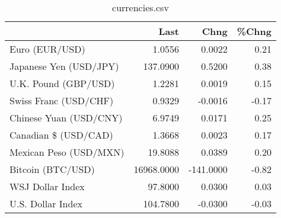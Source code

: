 \documentclass{article}%
\begin{document}
%


\begin{table}[htbp]%
\caption{currencies.csv}%
\centering%
\begin{adjustbox}{width=1\textwidth}%
\begin{tabular}{lrrr}
\toprule
                       &       Last &      Chng &  \%Chng \\
\midrule
        Euro (EUR/USD) &     1.0556 &    0.0022 &   0.21 \\
Japanese Yen (USD/JPY) &   137.0900 &    0.5200 &   0.38 \\
  U.K. Pound (GBP/USD) &     1.2281 &    0.0019 &   0.15 \\
 Swiss Franc (USD/CHF) &     0.9329 &   -0.0016 &  -0.17 \\
Chinese Yuan (USD/CNY) &     6.9749 &    0.0171 &   0.25 \\
  Canadian \$ (USD/CAD) &     1.3668 &    0.0023 &   0.17 \\
Mexican Peso (USD/MXN) &    19.8088 &    0.0389 &   0.20 \\
     Bitcoin (BTC/USD) & 16968.0000 & -141.0000 &  -0.82 \\
      WSJ Dollar Index &    97.8000 &    0.0300 &   0.03 \\
     U.S. Dollar Index &   104.7800 &   -0.0300 &  -0.03 \\
\bottomrule
\end{tabular}
%
\end{adjustbox}%
\end{table}

%
\end{document}
